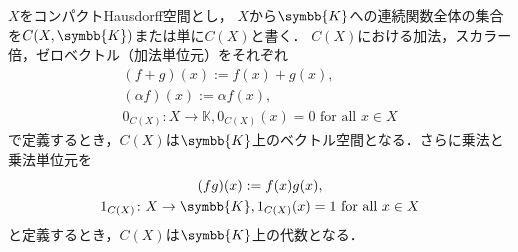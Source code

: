 \documentclass[../main.tex]{subfiles}
\begin{document}
\begin{thmbox}
\begin{proposition}[（コンパクトHausdorff空間上の連続関数全体の集合から作られる代数）]
\(X\)をコンパクトHausdorff空間とし，
\(X\)から\(\symbb{K}\)への連続関数全体の集合を\(C(X, \symbb{K})\)または単に\(C(X)\)と書く．
\(C(X)\)における加法，スカラー倍，ゼロベクトル（加法単位元）をそれぞれ
\begin{gather*}
    (f + g)(x) := f(x) + g(x),\\
    (\alpha f)(x) := \alpha f(x), \\
    0_{C(X)} \colon X \to \mathbb{K}, \text{\(0_{C(X)} (x) = 0\)  for all \(x \in X
\)}
\end{gather*}
で定義するとき，\(C(X)\)は\(\symbb{K}\)上のベクトル空間となる．さらに乗法と乗法単位元を
\begin{gather*}
    (fg)(x) := f(x)g(x), \\
    1_{C(X)} \colon X \to \symbb{K},\text{\(1_{C(X)}(x) = 1\) for all \(x \in X\)}
\end{gather*}
と定義するとき，\(C(X)\)は\(\symbb{K}\)上の代数となる．
\end{proposition}
\end{thmbox}
\end{document}
